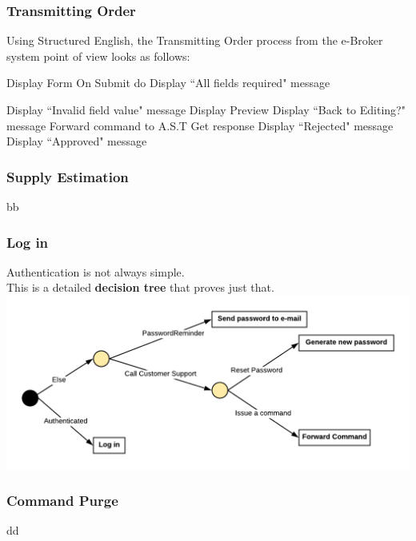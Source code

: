 \documentclass{article}
\begin{document}
\subsubsection{Transmitting Order}
Using Structured English, the Transmitting Order process from the e-Broker system point of view looks as follows:\\
\begin{algorithmic}[H]
  	\STATE Display Form
  	\STATE On Submit do
  		\STATE Display ``All fields required" message
   
  		\STATE Display ``Invalid field value" message
  	\ELSE
  		\STATE Display Preview
  		\STATE Display ``Back to Editing?" message
  	\ENDIF
 \ENDWHILE
 \STATE Forward command to A.S.T
 \STATE Get response
  	\STATE Display ``Rejected" message
 \ELSE
  	\STATE Display ``Approved" message
 \ENDIF

\end{algorithmic}

\subsubsection{Supply Estimation}
bb

\subsubsection{Log in}
Authentication is not always simple.\\
This is a detailed \textbf{decision tree} that proves just that.\\
\includegraphics[scale=0.3]{decisionTree} 

\subsubsection{Command Purge}
dd
\end{document}
